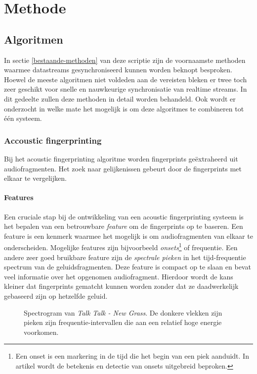 \chapter{Methode}

\section{Algoritmen}

In sectie \ref{bestaande-methoden} van deze scriptie zijn de voornaamste methoden waarmee datastreams gesynchroniseerd kunnen worden beknopt besproken. Hoewel de meeste algoritmen niet voldeden aan de vereisten bleken er twee toch zeer geschikt voor snelle en nauwkeurige synchronisatie van realtime streams. In dit gedeelte zullen deze methoden in detail worden behandeld. Ook wordt er onderzocht in welke mate het mogelijk is om deze algoritmes te combineren tot één systeem.

\subsection{Accoustic fingerprinting}
\label{acoustic-fingerprinting}

Bij het acoustic fingerprinting algoritme worden fingerprints geëxtraheerd uit audiofragmenten. Het zoek naar gelijkenissen gebeurt door de fingerprints met elkaar te vergelijken. 

\subsubsection{Features}

Een cruciale stap bij de ontwikkeling van een acoustic fingerprinting systeem is het bepalen van een betrouwbare \textit{feature} om de fingerprints op te baseren. Een feature is een kenmerk waarmee het mogelijk is om audiofragmenten van elkaar te onderscheiden. Mogelijke features zijn bijvoorbeeld \textit{onsets}\footnote{Een onset is een markering in de tijd die het begin van een piek aanduidt. In artikel \cite{bello2005tutorial} wordt de betekenis en detectie van onsets uitgebreid beproken.} of frequentie. Een andere zeer goed bruikbare feature zijn de \textit{spectrale pieken} in het tijd-frequentie spectrum van de geluidsfragmenten. Deze feature is compact op te slaan en bevat veel informatie over het opgenomen audiofragment. Hierdoor wordt de kans kleiner dat fingerprints gematcht kunnen worden zonder dat ze daadwerkelijk gebaseerd zijn op hetzelfde geluid.

\begin{figure}[h!]
	\captionsetup{width=0.7\textwidth}
	\caption[Voorbeeld van een spectrogram]{Spectrogram van \textit{Talk Talk - New Grass}. De donkere vlekken zijn pieken zijn frequentie-intervallen die aan een relatief hoge energie voorkomen.}
	\begin{center}
		\advance\parskip0.3cm
		
	\end{center}
	\label{spectrogram}
\end{figure}

